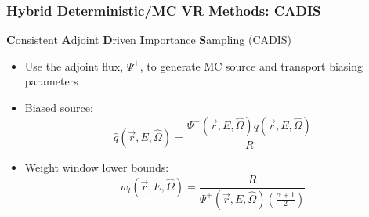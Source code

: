\documentclass{beamer}
\begin{document}

\begin{frame}
\frametitle{Hybrid Deterministic/MC VR Methods: CADIS}
	\begin{block}{\textbf{C}onsistent \textbf{A}djoint \textbf{D}riven
	\textbf{I}mportance \textbf{S}ampling (CADIS)}
  \begin{itemize}
  \item{Use the adjoint flux, $\Psi^+$, to generate MC source and transport biasing
	  parameters}
  \item{Biased source:}
\begin{equation} \label{eq:3.8}
	\widehat{q}(\overrightarrow{r}, E, \widehat{\Omega}) =
	\frac{\Psi^{+}(\overrightarrow{r}, E,\widehat{\Omega})
	q(\overrightarrow{r}, E, \widehat{\Omega})}{R}
\end{equation}

  \item{Weight window lower bounds:}
\begin{equation} \label{eq:3.12}
	w_{l}(\overrightarrow{r}, E, \widehat{\Omega}) = 
	\frac{R}{\Psi^{+}(\overrightarrow{r}, E, \widehat{\Omega})
	(\frac{\alpha + 1}{2})}
\end{equation}
  \end{itemize}
\end{block}
\end{frame}
\end{document}
